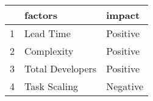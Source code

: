 \begin{tabular}{lll}
\toprule
{} &           factors &    impact \\
\midrule
1 &         Lead Time &  Positive \\
2 &        Complexity &  Positive \\
3 &  Total Developers &  Positive \\
4 &      Task Scaling &  Negative \\
\bottomrule
\end{tabular}
